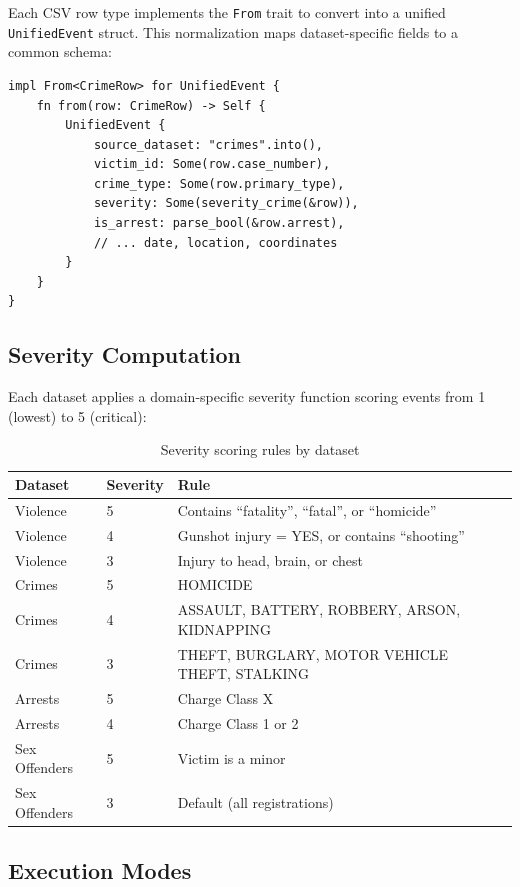 \documentclass[12pt,a4paper]{article}
\begin{document}
Each CSV row type implements the \texttt{From} trait to convert into a unified \texttt{UnifiedEvent} struct. This normalization maps dataset-specific fields to a common schema:

\begin{lstlisting}[caption={Unified event normalization (simplified)}]
impl From<CrimeRow> for UnifiedEvent {
    fn from(row: CrimeRow) -> Self {
        UnifiedEvent {
            source_dataset: "crimes".into(),
            victim_id: Some(row.case_number),
            crime_type: Some(row.primary_type),
            severity: Some(severity_crime(&row)),
            is_arrest: parse_bool(&row.arrest),
            // ... date, location, coordinates
        }
    }
}
\end{lstlisting}

\subsection{Severity Computation}

Each dataset applies a domain-specific severity function scoring events from 1 (lowest) to 5 (critical):

\begin{table}[H]
\centering
\caption{Severity scoring rules by dataset}
\label{tab:severity}
\begin{tabularx}{\textwidth}{l l X}
\toprule
\textbf{Dataset} & \textbf{Severity} & \textbf{Rule} \\
\midrule
Violence & 5 & Contains ``fatality'', ``fatal'', or ``homicide'' \\
Violence & 4 & Gunshot injury = YES, or contains ``shooting'' \\
Violence & 3 & Injury to head, brain, or chest \\
Crimes & 5 & HOMICIDE \\
Crimes & 4 & ASSAULT, BATTERY, ROBBERY, ARSON, KIDNAPPING \\
Crimes & 3 & THEFT, BURGLARY, MOTOR VEHICLE THEFT, STALKING \\
Arrests & 5 & Charge Class X \\
Arrests & 4 & Charge Class 1 or 2 \\
Sex Offenders & 5 & Victim is a minor \\
Sex Offenders & 3 & Default (all registrations) \\
\bottomrule
\end{tabularx}
\end{table}

\subsection{Execution Modes}
\end{document}

